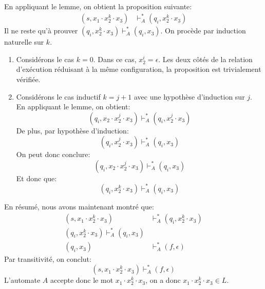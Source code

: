 En appliquant le lemme, on obtient la proposition suivante:
\begin{align*}
(s, x_1 \cdot x_2^k \cdot x_3) &\vdash_A^* (q_i, x_2^k \cdot x_3)
\end{align*}
Il ne reste qu'à prouver $(q_i, x_2^k \cdot x_3) \vdash_A^* (q_i, x_3)$.
On procède par induction naturelle sur $k$.
\begin{enumerate}
\item Considérons le cas $k = 0$. Dans ce cas, $x_2^i = \epsilon$. Les deux côtés de la relation d'exécution réduisant à la même configuration, la proposition est trivialement vérifiée.
\item
Considérons le cas inductif $k = j + 1$ avec une hypothèse d'induction sur $j$.
En appliquant le lemme, on obtient:
\[
(q_i, x_2 \cdot x_2^j \cdot x_3) \vdash_A^* (q_i, x_2^j \cdot x_3)
\]
De plus, par hypothèse d'induction:
\[
(q_i, x_2^j \cdot x_3) \vdash_A^* (q_i, x_3)
\]
On peut donc conclure:
\[
(q_i, x_2 \cdot x_2^j \cdot x_3) \vdash_A^* (q_i, x_3)
\]
Et donc que:
\[
(q_i, x_2^k \cdot x_3) \vdash_A^* (q_i, x_3)
\]
\end{enumerate}

En résumé, nous avons maintenant montré que:
\begin{align*}
(s, x_1 \cdot x_2^k \cdot x_3) &\vdash_A^* (q_i, x_2^k \cdot x_3)\\
(q_i, x_2^k \cdot x_3) \vdash_A^* (q_i, x_3)\\
(q_i, x_3) &\vdash_A^* (f, \epsilon)
\end{align*}
Par transitivité, on conclut:
\[
(s, x_1 \cdot x_2^k \cdot x_3) \vdash_A^* (f, \epsilon)
\]
L'automate $A$ accepte donc le mot $x_1 \cdot x_2^k \cdot x_3$, on a donc $x_1 \cdot x_2^k \cdot x_3 \in L$.





